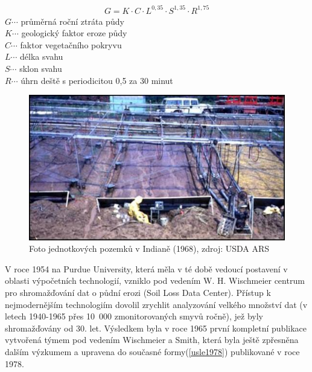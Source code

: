 \begin{align}
   \label{musgrave1947} G=K\cdot C\cdot L^{0,35}\cdot S^{1,35}\cdot R^{1,75}
\end{align}
\hspace*{2cm}$G \cdots$ průměrná roční ztráta půdy\\
\hspace*{2cm}$K \cdots$ geologický faktor eroze půdy \\
\hspace*{2cm}$C \cdots$ faktor vegetačního pokryvu \\
\hspace*{2cm}$L \cdots$ délka svahu \\
\hspace*{2cm}$S \cdots$ sklon svahu \\
\hspace*{2cm}$R \cdots$ úhrn deště s periodicitou 0,5 za 30 minut \\
\begin{figure}[H]
    \centering
    \includegraphics[scale=0.85]{./pictures/unit_plots2.jpg}
      \caption[Foto jednotkových pozemků v Indianě (1968)]{Foto
        jednotkových pozemků v Indianě (1968), zdroj: USDA
        ARS\cite{usda_ars}}
      \label{fig:unit_plots}
\end{figure}
V roce 1954 na Purdue University, která měla v té době vedoucí
postavení v oblasti výpočetních technologií, vzniklo pod vedením
W. H. Wischmeier centrum pro shromažďování dat o půdní erozi (Soil
Loss Data Center). Přístup k nejmodernějším technologiím dovolil
zrychlit analyzování velkého množství dat (v letech 1940-1965 přes
10~000 zmonitorovaných smyvů ročně), jež byly shromažďovány od
30. let. Výsledkem byla v roce 1965 první kompletní publikace
vytvořená týmem pod vedením Wischmeier a Smith, která byla ještě
zpřesněna dalším výzkumem a upravena do současné formy(\ref{usle1978})
publikované v roce 1978.\cite{usle1978}

